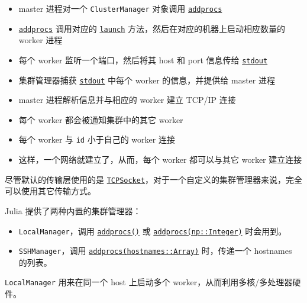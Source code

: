 \begin{itemize}
\item master 进程对一个 \texttt{ClusterManager} 对象调用 \hyperlink{2657399037748470653}{\texttt{addprocs}}


\item \hyperlink{2657399037748470653}{\texttt{addprocs}} 调用对应的 \hyperlink{7346188534454273843}{\texttt{launch}} 方法，然后在对应的机器上启动相应数量的 worker 进程


\item 每个 worker 监听一个端口，然后将其 host 和 port 信息传给 \hyperlink{18181294266083891471}{\texttt{stdout}}


\item 集群管理器捕获 \hyperlink{18181294266083891471}{\texttt{stdout}} 中每个 worker 的信息，并提供给 master 进程


\item master 进程解析信息并与相应的 worker 建立 TCP/IP 连接


\item 每个 worker 都会被通知集群中的其它 worker


\item 每个 worker 与 \texttt{id} 小于自己的 worker 连接


\item 这样，一个网络就建立了，从而，每个 worker 都可以与其它 worker 建立连接

\end{itemize}


尽管默认的传输层使用的是 \hyperlink{5453047654537213204}{\texttt{TCPSocket}}，对于一个自定义的集群管理器来说，完全可以使用其它传输方式。



Julia 提供了两种内置的集群管理器：



\begin{itemize}
\item \texttt{LocalManager}，调用 \hyperlink{2657399037748470653}{\texttt{addprocs()}} 或 \hyperlink{2657399037748470653}{\texttt{addprocs(np::Integer)}} 时会用到。


\item \texttt{SSHManager}，调用 \hyperlink{2657399037748470653}{\texttt{addprocs(hostnames::Array)}} 时，传递一个 hostnames 的列表。

\end{itemize}


\texttt{LocalManager} 用来在同一个 host 上启动多个 worker，从而利用多核/多处理器硬件。



